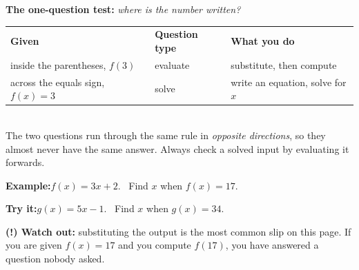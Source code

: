 \documentclass[12pt]{article}
\begin{document}
\begin{formulabox}\textbf{The one-question test:} \emph{where is the number
written?}\\[3pt]
\begin{tabular}{@{}l@{\quad}l@{\quad}l@{}}
\textbf{Given} & \textbf{Question type} & \textbf{What you do}\\
inside the parentheses, $f(3)$ & evaluate & substitute, then compute\\
across the equals sign, $f(x) = 3$ & solve & write an equation, solve for $x$\\
\end{tabular}\\[3pt]
The two questions run through the same rule in \emph{opposite directions}, so
they almost never have the same answer. Always check a solved input by
evaluating it forwards.
\end{formulabox}
\begin{examplebox}\textbf{Example:}\quad $f(x) = 3x + 2$. \ Find $x$ when $f(x) = 17$.
\end{examplebox}
\begin{tryitbox}\textbf{Try it:}\quad $g(x) = 5x - 1$. \ Find $x$ when $g(x) = 34$.\\[2pt]
\end{tryitbox}
\begin{watchoutbox}\textbf{(!) Watch out:} substituting the output is the most
common slip on this page. If you are given $f(x) = 17$ and you compute $f(17)$,
you have answered a question nobody asked.
\end{watchoutbox}
\end{document}
